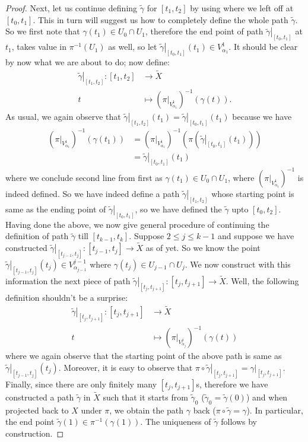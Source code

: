 \documentclass[letterpaper,11pt,twoside]{article}
\theoremstyle{definition}
\theoremstyle{definition}
\theoremstyle{definition}
\theoremstyle{definition}
\theoremstyle{definition}
\theoremstyle{definition}
\theoremstyle{remark}
\theoremstyle{definition}
\newcommand{\rest}[2]{\left. { #1 }\right \vert_{#2}}
\newcommand{\inv}[1]{\left(#1\right)^{-1}}
\begin{document}
\begin{proof}
Next, let us continue defining $\tilde\gamma$ for $[t_1,t_2]$ by using where we left off at $[t_0,t_1]$. This in turn will suggest us how to completely define the whole path $\tilde{\gamma}$. So we first note that $\gamma(t_1)\in U_0 \cap U_1$, therefore the end point of path $\rest{\tilde\gamma}{[t_0,t_1]}$ at $t_1$, takes value in $\pi^{-1}(U_1)$ as well, so let $\rest{\tilde\gamma}{[t_0,t_1]}(t_1) \in V^1_{\alpha_1} $. It should be clear by now what we are about to do; now define:
\begin{align*}
    \rest{\tilde\gamma}{[t_1,t_2]} : [t_1,t_2] &\longrightarrow \tilde{X}\\
    t &\longmapsto \inv{\rest{\pi}{V^1_{\alpha_1}}}(\gamma(t)).
\end{align*}
As usual, we again observe that $\rest{\tilde{\gamma}}{[t_1,t_2]} (t_1) = \rest{\tilde{\gamma}}{[t_0,t_1]}(t_1)$ because we have
\begin{align*}
    \inv{\rest{\pi}{V^1_{\alpha_1}}}(\gamma(t_1)) &= \inv{\rest{\pi}{V^1_{\alpha_1}}}(\pi(\rest{\tilde{\gamma}}{[t_0,t_1]}(t_1) ))\\
    &= \rest{\tilde{\gamma}}{[t_0,t_1]}(t_1)
\end{align*}
where we conclude second line from first as $\gamma(t_1) \in U_0\cap U_1$, where $\inv{\rest{\pi}{V^1_{\alpha_1}}}$ is indeed defined. So we have indeed define a path $\rest{\tilde{\gamma}}{[t_1,t_2]}$ whose starting point is same as the ending point of $\rest{\tilde\gamma}{[t_0,t_1]}$, so we have defined the $\tilde\gamma$ upto $[t_0,t_2]$. \\

Having done the above, we now give general procedure of continuing the definition of path $\tilde\gamma$ till $[t_{k-1}, t_k]$. Suppose $2\le j\le k-1$ and suppose we have constructed  $\rest{\tilde\gamma}{[t_{j-1},t_j]} : [t_{j-1},t_j] \to \tilde{X}$ as of yet. So we know the point $\rest{\tilde\gamma}{[t_{j-1}, t_j]}(t_j)\in V^{j-1}_{\alpha_{j-1}}$ where $ \gamma(t_j)\in U_{j-1} \cap U_j$. We now construct with this information the next piece of path $\rest{\tilde\gamma}{[t_{j}, t_{j+1}]} : [t_j,t_{j+1}] \to \tilde{X}$. Well, the following definition shouldn't be a surprise:
\begin{align*}
    \rest{\tilde\gamma}{[t_j,t_{j+1}]} : [t_j,t_{j+1}] &\longrightarrow \tilde{X}\\
    t&\longmapsto \inv{\rest{\pi}{V^j_{\alpha_j}}}(\gamma(t))
\end{align*}
where we again observe that the starting point of the above path is same as $\rest{\tilde\gamma}{[t_{j-1}, t_j]}(t_j)$. Moreover, it is easy to observe that $\pi\circ \rest{\tilde\gamma}{[t_j,t_{j+1}]}= \rest{\gamma}{[t_j,t_{j+1}]}$.\\

Finally, since there are only finitely many $[t_j,t_{j+1}]$s, therefore we have constructed a path $\tilde\gamma$ in $\tilde X$ such that it starts from $\tilde{\gamma}_0$ ($\tilde{\gamma}_0 = \tilde{\gamma}(0)$) and when projected back to $X$ under $\pi$, we obtain the path $\gamma $ back ($\pi \circ \tilde \gamma = \gamma$). In particular, the end point $\tilde\gamma (1)\in \pi^{-1}(\gamma(1))$. The uniqueness of $\tilde{\gamma}$ follows by construction.
\end{proof}
\end{document}
